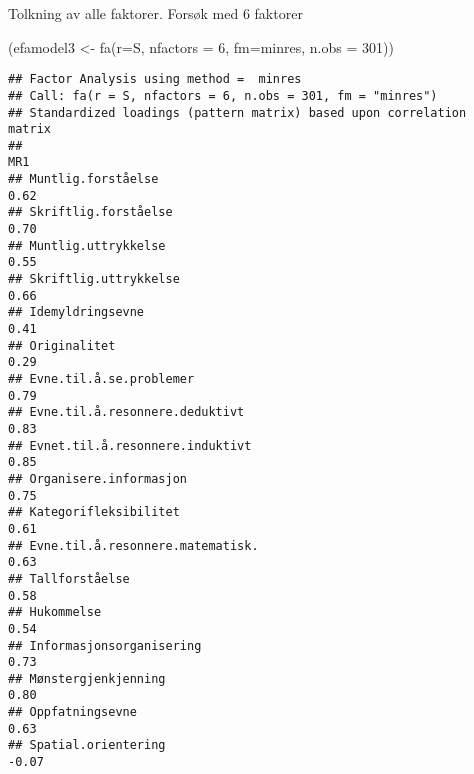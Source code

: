 \documentclass[
]{article}
\newenvironment{Shaded}{\begin{snugshade}}{\end{snugshade}}
\newcommand{\AttributeTok}[1]{\textcolor[rgb]{0.77,0.63,0.00}{#1}}
\newcommand{\DecValTok}[1]{\textcolor[rgb]{0.00,0.00,0.81}{#1}}
\newcommand{\FunctionTok}[1]{\textcolor[rgb]{0.00,0.00,0.00}{#1}}
\newcommand{\NormalTok}[1]{#1}
\newcommand{\OtherTok}[1]{\textcolor[rgb]{0.56,0.35,0.01}{#1}}
\newcommand{\StringTok}[1]{\textcolor[rgb]{0.31,0.60,0.02}{#1}}
\begin{document}
Tolkning av alle faktorer. Forsøk med 6 faktorer

\begin{Shaded}
\begin{Highlighting}[]
\NormalTok{(efamodel3 }\OtherTok{\textless{}{-}} \FunctionTok{fa}\NormalTok{(}\AttributeTok{r=}\NormalTok{S, }\AttributeTok{nfactors =} \DecValTok{6}\NormalTok{, }\AttributeTok{fm=}\StringTok{\textquotesingle{}minres\textquotesingle{}}\NormalTok{, }\AttributeTok{n.obs =} \DecValTok{301}\NormalTok{)) }
\end{Highlighting}
\end{Shaded}

\begin{verbatim}
## Factor Analysis using method =  minres
## Call: fa(r = S, nfactors = 6, n.obs = 301, fm = "minres")
## Standardized loadings (pattern matrix) based upon correlation matrix
##                                                                                    MR1
## Muntlig.forståelse                                                                0.62
## Skriftlig.forståelse                                                              0.70
## Muntlig.uttrykkelse                                                               0.55
## Skriftlig.uttrykkelse                                                             0.66
## Idemyldringsevne                                                                  0.41
## Originalitet                                                                      0.29
## Evne.til.å.se.problemer                                                           0.79
## Evne.til.å.resonnere.deduktivt                                                    0.83
## Evnet.til.å.resonnere.induktivt                                                   0.85
## Organisere.informasjon                                                            0.75
## Kategorifleksibilitet                                                             0.61
## Evne.til.å.resonnere.matematisk.                                                  0.63
## Tallforståelse                                                                    0.58
## Hukommelse                                                                        0.54
## Informasjonsorganisering                                                          0.73
## Mønstergjenkjenning                                                               0.80
## Oppfatningsevne                                                                   0.63
## Spatial.orientering                                                              -0.07

\end{verbatim}
\end{document}
